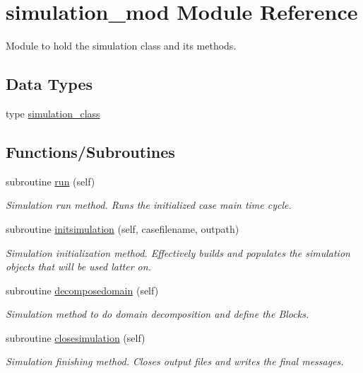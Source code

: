 \hypertarget{namespacesimulation__mod}{}\section{simulation\+\_\+mod Module Reference}
\label{namespacesimulation__mod}


Module to hold the simulation class and its methods.  


\subsection*{Data Types}
\begin{DoxyCompactItemize}
\item 
type \hyperlink{structsimulation__mod_1_1simulation__class}{simulation\+\_\+class}
\end{DoxyCompactItemize}
\subsection*{Functions/\+Subroutines}
\begin{DoxyCompactItemize}
\item 
subroutine \hyperlink{namespacesimulation__mod_a73bd78c4ac76c51f1e10f5847c25c4df}{run} (self)
\begin{DoxyCompactList}\small\item\em Simulation run method. Runs the initialized case main time cycle. \end{DoxyCompactList}\item 
subroutine \hyperlink{namespacesimulation__mod_aedbba2bb458cbcd7eb93938a5f7b5940}{initsimulation} (self, casefilename, outpath)
\begin{DoxyCompactList}\small\item\em Simulation initialization method. Effectively builds and populates the simulation objects that will be used latter on. \end{DoxyCompactList}\item 
subroutine \hyperlink{namespacesimulation__mod_a2b8198a9fb3f7671c6b45192a0b9740c}{decomposedomain} (self)
\begin{DoxyCompactList}\small\item\em Simulation method to do domain decomposition and define the Blocks. \end{DoxyCompactList}\item 
subroutine \hyperlink{namespacesimulation__mod_a4285722eaa589fa671233554b54c74f8}{closesimulation} (self)
\begin{DoxyCompactList}\small\item\em Simulation finishing method. Closes output files and writes the final messages. \end{DoxyCompactList}\end{DoxyCompactItemize}


